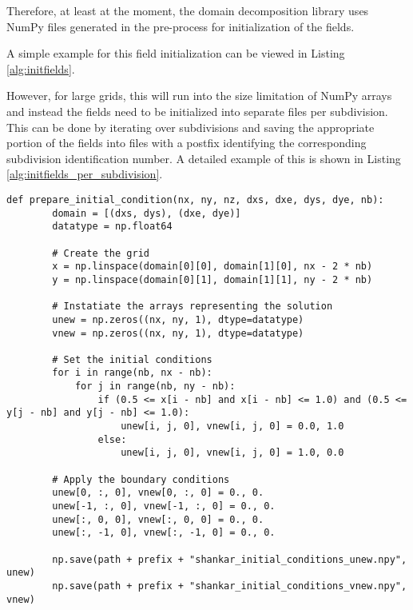 Therefore, at least at the moment, the domain decomposition library uses NumPy files generated in the pre-process for initialization of the fields.

A simple example for this field initialization can be viewed in Listing \ref{alg:initfields}.

However, for large grids, this will run into the size limitation of NumPy arrays and instead the fields need to be initialized into separate files per subdivision.
This can be done by iterating over subdivisions and saving the appropriate portion of the fields into files with a postfix identifying the corresponding subdivision identification number.
A detailed example of this is shown in Listing \ref{alg:initfields_per_subdivision}.

\begin{lstlisting}[caption={Example code of the domain pre-process function to initialize the fields "unew" and "vnew" for the Shankar use case.},captionpos=b, label={alg:initfields}, float, floatplacement=H]
def prepare_initial_condition(nx, ny, nz, dxs, dxe, dys, dye, nb):
        domain = [(dxs, dys), (dxe, dye)]
        datatype = np.float64

        # Create the grid
        x = np.linspace(domain[0][0], domain[1][0], nx - 2 * nb)
        y = np.linspace(domain[0][1], domain[1][1], ny - 2 * nb)

        # Instatiate the arrays representing the solution
        unew = np.zeros((nx, ny, 1), dtype=datatype)
        vnew = np.zeros((nx, ny, 1), dtype=datatype)

        # Set the initial conditions
        for i in range(nb, nx - nb):
            for j in range(nb, ny - nb):
                if (0.5 <= x[i - nb] and x[i - nb] <= 1.0) and (0.5 <= y[j - nb] and y[j - nb] <= 1.0):
                    unew[i, j, 0], vnew[i, j, 0] = 0.0, 1.0
                else:
                    unew[i, j, 0], vnew[i, j, 0] = 1.0, 0.0

        # Apply the boundary conditions
        unew[0, :, 0], vnew[0, :, 0] = 0., 0.
        unew[-1, :, 0], vnew[-1, :, 0] = 0., 0.
        unew[:, 0, 0], vnew[:, 0, 0] = 0., 0.
        unew[:, -1, 0], vnew[:, -1, 0] = 0., 0.

        np.save(path + prefix + "shankar_initial_conditions_unew.npy", unew)
        np.save(path + prefix + "shankar_initial_conditions_vnew.npy", vnew)
\end{lstlisting}


